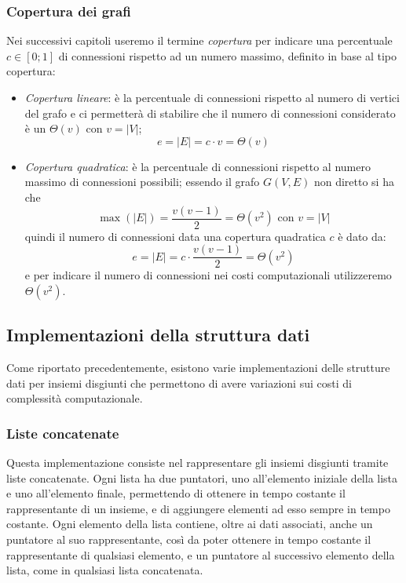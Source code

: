 \subsubsection{Copertura dei grafi}

Nei successivi capitoli useremo il termine \textit{copertura} per indicare una percentuale $c \in [0; 1]$ di connessioni rispetto
ad un numero massimo, definito in base al tipo copertura:

\begin{itemize}
    \item \textit{Copertura lineare}: è la percentuale di connessioni rispetto al numero di vertici del grafo
          e ci permetterà di stabilire che il numero di connessioni considerato è un $\Theta(v)$ con $v = |V|$;
          \begin{equation}
              e = |E| = c \cdot v = \Theta(v) \label{linearCoverage}
          \end{equation}
    \item \textit{Copertura quadratica}: è la percentuale di connessioni rispetto al numero massimo di connessioni
          possibili; essendo il grafo $G(V, E)$ non diretto si ha che
          \begin{equation} \label{maxedges}
              \max(|E|) = \frac{v(v-1)}{2} = \Theta(v^2) \text{ con } v = |V|
          \end{equation}
          quindi il numero di connessioni data una copertura quadratica $c$ è dato da:
          \begin{equation} \label{quadraticCoverage}
              e = |E| = c \cdot \frac{v(v-1)}{2} = \Theta(v^2)
          \end{equation}
          e per indicare il numero di connessioni nei costi computazionali utilizzeremo $\Theta(v^2)$.
\end{itemize}

\subsection{Implementazioni della struttura dati}
Come riportato precedentemente, esistono varie implementazioni delle strutture
dati per insiemi disgiunti che permettono di avere variazioni sui costi di complessità
computazionale.

\subsubsection{Liste concatenate}
Questa implementazione consiste nel rappresentare gli insiemi disgiunti tramite liste
concatenate. Ogni lista ha due puntatori, uno all'elemento iniziale della lista e uno
all'elemento finale, permettendo di ottenere in tempo costante il rappresentante di un
insieme, e di aggiungere elementi ad esso sempre in tempo costante. Ogni elemento della
lista contiene, oltre ai dati associati, anche un puntatore al suo rappresentante, così da poter
ottenere in tempo costante il rappresentante di qualsiasi elemento, e un puntatore al
successivo elemento della lista, come in qualsiasi lista concatenata.\newline

